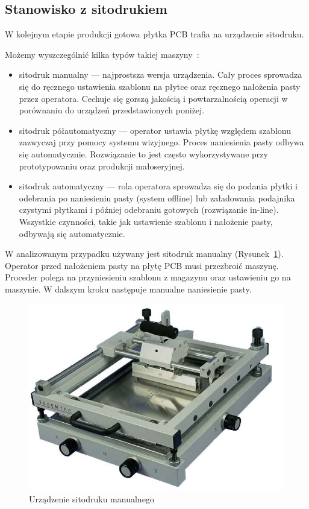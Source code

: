 \subsection{Stanowisko z sitodrukiem}
W kolejnym etapie produkcji gotowa płytka PCB trafia na urządzenie sitodruku.

\breakparagraph{}
Możemy wyszczególnić kilka typów takiej maszyny~\cite{sitodruk}:
\begin{itemize}
	\item sitodruk manualny --- najprostsza wersja urządzenia. Cały proces sprowadza się do ręcznego ustawienia szablonu na płytce oraz ręcznego nałożenia pasty przez operatora. Cechuje się gorszą jakością i powtarzalnością operacji w porównaniu do urządzeń przedstawionych poniżej.
	\item sitodruk półautomatyczny --- operator ustawia płytkę względem szablonu zazwyczaj przy pomocy systemu wizyjnego. Proces naniesienia pasty odbywa się automatycznie. Rozwiązanie to jest często wykorzystywane przy prototypowaniu oraz produkcji małoseryjnej.
	\item sitodruk automatyczny --- rola operatora sprowadza się do podania płytki i odebrania po naniesieniu pasty (system offline) lub załadowania podajnika czystymi płytkami i później odebraniu gotowych (rozwiązanie in-line). Wszystkie czynności, takie jak ustawienie szablonu i nałożenie pasty, odbywają się automatycznie.
\end{itemize}

W analizowanym przypadku używany jest sitodruk manualny (Rysunek~\ref{sitodruk}). Operator przed nałożeniem pasty na płytę PCB musi przezbroić maszynę. Proceder polega na przyniesieniu szablonu z magazynu oraz ustawieniu go na maszynie. W dalszym kroku następuje manualne naniesienie pasty.

\begin{figure}[H]
	\centering
	\includegraphics[scale=0.25]{./chapters/chapter2/sitodruk.jpg}
	\caption{Urządzenie sitodruku manualnego~\cite{sitodruk}}
	\label{sitodruk}
\end{figure}

